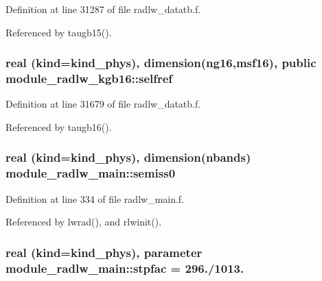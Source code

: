 Definition at line 31287 of file radlw\+\_\+datatb.\+f.



Referenced by taugb15().

\subsubsection[{\texorpdfstring{selfref}{selfref}}]{\setlength{\rightskip}{0pt plus 5cm}real (kind=kind\+\_\+phys), dimension(ng16,msf16), public module\+\_\+radlw\+\_\+kgb16\+::selfref}\hypertarget{group__module__radlw__main_gafaa2554e1161bd6c983ce630d39d703a}{}\label{group__module__radlw__main_gafaa2554e1161bd6c983ce630d39d703a}


Definition at line 31679 of file radlw\+\_\+datatb.\+f.



Referenced by taugb16().

\subsubsection[{\texorpdfstring{semiss0}{semiss0}}]{\setlength{\rightskip}{0pt plus 5cm}real (kind=kind\+\_\+phys), dimension(nbands) module\+\_\+radlw\+\_\+main\+::semiss0\hspace{0.3cm}{\ttfamily [private]}}\hypertarget{group__module__radlw__main_gae3b32aa685e5f07a0003c5e919d22996}{}\label{group__module__radlw__main_gae3b32aa685e5f07a0003c5e919d22996}


Definition at line 334 of file radlw\+\_\+main.\+f.



Referenced by lwrad(), and rlwinit().

\subsubsection[{\texorpdfstring{stpfac}{stpfac}}]{\setlength{\rightskip}{0pt plus 5cm}real (kind=kind\+\_\+phys), parameter module\+\_\+radlw\+\_\+main\+::stpfac = 296./1013.\hspace{0.3cm}{\ttfamily [private]}}\hypertarget{group__module__radlw__main_ga483b88df2bdada7ef349d9530f91b762}{}\label{group__module__radlw__main_ga483b88df2bdada7ef349d9530f91b762}


